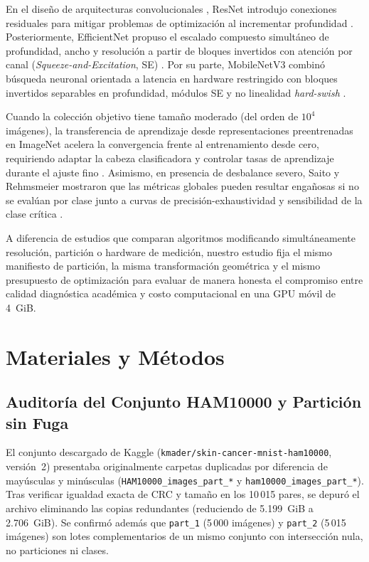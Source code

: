\documentclass[conference]{IEEEtran}
\begin{document}
En el dise\~no de arquitecturas convolucionales \cite{goodfellow2016}, ResNet introdujo conexiones residuales para mitigar problemas de optimizaci\'on al incrementar profundidad \cite{he2016}. Posteriormente, EfficientNet propuso el escalado compuesto simult\'aneo de profundidad, ancho y resoluci\'on a partir de bloques invertidos con atenci\'on por canal (\textit{Squeeze-and-Excitation}, SE) \cite{tan2019}. Por su parte, MobileNetV3 combin\'o b\'usqueda neuronal orientada a latencia en hardware restringido con bloques invertidos separables en profundidad, m\'odulos SE y no linealidad \textit{hard-swish} \cite{howard2019}.

Cuando la colecci\'on objetivo tiene tama\~no moderado (del orden de $10^4$ im\'agenes), la transferencia de aprendizaje desde representaciones preentrenadas en ImageNet acelera la convergencia frente al entrenamiento desde cero, requiriendo adaptar la cabeza clasificadora y controlar tasas de aprendizaje durante el ajuste fino \cite{pan2010}. Asimismo, en presencia de desbalance severo, Saito y Rehmsmeier mostraron que las m\'etricas globales pueden resultar enga\~nosas si no se eval\'uan por clase junto a curvas de precisi\'on-exhaustividad y sensibilidad de la clase cr\'itica \cite{saito2015}.

A diferencia de estudios que comparan algoritmos modificando simult\'aneamente resoluci\'on, partici\'on o hardware de medici\'on, nuestro estudio fija el mismo manifiesto de partici\'on, la misma transformaci\'on geom\'etrica y el mismo presupuesto de optimizaci\'on para evaluar de manera honesta el compromiso entre calidad diagn\'ostica acad\'emica y costo computacional en una GPU m\'ovil de 4~GiB.

\section{Materiales y M\'etodos}

\subsection{Auditor\'ia del Conjunto HAM10000 y Partici\'on sin Fuga}
El conjunto descargado de Kaggle (\texttt{kmader/skin-cancer-mnist-ham10000}, versi\'on~2) presentaba originalmente carpetas duplicadas por diferencia de may\'usculas y min\'usculas (\texttt{HAM10000\_images\_part\_*} y \texttt{ham10000\_images\_part\_*}). Tras verificar igualdad exacta de CRC y tama\~no en los 10\,015 pares, se depur\'o el archivo eliminando las copias redundantes (reduciendo de 5.199~GiB a 2.706~GiB). Se confirm\'o adem\'as que \texttt{part\_1} (5\,000 im\'agenes) y \texttt{part\_2} (5\,015 im\'agenes) son lotes complementarios de un mismo conjunto con intersecci\'on nula, no particiones ni clases.
\end{document}
